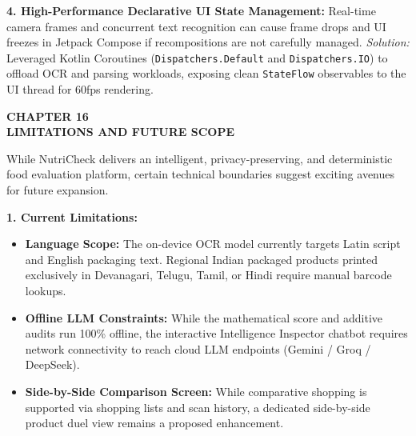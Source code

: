 \documentclass[12pt]{article}
\begin{document}
\vspace{0.3cm}

\noindent
\textbf{4. High-Performance Declarative UI State Management:}
Real-time camera frames and concurrent text recognition can cause frame drops and UI freezes in Jetpack Compose if recompositions are not carefully managed.
\textit{Solution:} Leveraged Kotlin Coroutines (\texttt{Dispatchers.Default} and \texttt{Dispatchers.IO}) to offload OCR and parsing workloads, exposing clean \texttt{StateFlow} observables to the UI thread for 60fps rendering.

\newpage

\begin{center}
\textbf{\Large CHAPTER 16}\\[0.5cm]
\textbf{\Large LIMITATIONS AND FUTURE SCOPE}\\[1cm]
\end{center}

\noindent
While NutriCheck delivers an intelligent, privacy-preserving, and deterministic food evaluation platform, certain technical boundaries suggest exciting avenues for future expansion.

\vspace{0.3cm}

\noindent
\textbf{1. Current Limitations:}
\begin{itemize}
    \item \textbf{Language Scope:} The on-device OCR model currently targets Latin script and English packaging text. Regional Indian packaged products printed exclusively in Devanagari, Telugu, Tamil, or Hindi require manual barcode lookups.
    \item \textbf{Offline LLM Constraints:} While the mathematical score and additive audits run 100\% offline, the interactive Intelligence Inspector chatbot requires network connectivity to reach cloud LLM endpoints (Gemini / Groq / DeepSeek).
    \item \textbf{Side-by-Side Comparison Screen:} While comparative shopping is supported via shopping lists and scan history, a dedicated side-by-side product duel view remains a proposed enhancement.
\end{itemize}

\vspace{0.3cm}
\end{document}
